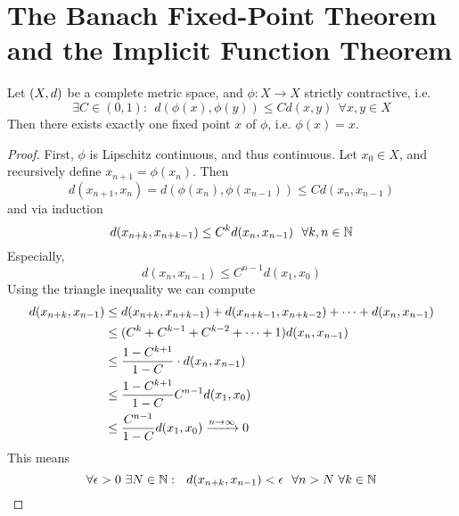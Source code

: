 \documentclass[../../script.tex]{subfiles}
\begin{document}
\section[Banach Fixed-Point \& Implicit Functions]{The Banach Fixed-Point Theorem and the Implicit Function Theorem}

\begin{thm}
    Let $(X, d)$ be a complete metric space, and $\phi: X \rightarrow X$ strictly contractive, i.e.
    \[
        \exists C \in (0, 1): ~~d(\phi(x), \phi(y)) \le C d(x, y) ~~\forall x, y \in X
    \]
    Then there exists exactly one fixed point $x$ of $\phi$, i.e. $\phi(x) = x$.
\end{thm}
\begin{proof}
    First, $\phi$ is Lipschitz continuous, and thus continuous.
    Let $x_0 \in X$, and recursively define $x_{n+1} = \phi(x_n)$. Then 
    \begin{equation}
        d(x_{n+1}, x_n) = d(\phi(x_n), \phi(x_{n-1})) \le C d(x_n, x_{n-1})
    \end{equation}
    and via induction
    \begin{equation}
        d(x_{n+k}, x_{n+k-1}) \le C^k d(x_n, x_{n-1}) ~~\forall k, n \in \mathbb{N}
    \end{equation}
    Especially,
    \begin{equation}
        d(x_n, x_{n-1}) \le C^{n-1} d(x_1, x_0)
    \end{equation}
    Using the triangle inequality we can compute 
    \begin{equation}
        \begin{split}
            d(x_{n+k}, x_{n-1}) &\le d(x_{n+k}, x_{n+k-1}) + d(x_{n+k-1}, x_{n+k-2}) + \cdots + d(x_n, x_{n-1}) \\
            &\le (C^k + C^{k-1} + C^{k-2} + \cdots + 1) d(x_n, x_{n-1}) \\
            &\le \frac{1 - C^{k+1}}{1 - C} \cdot d(x_n, x_{n-1}) \\
            &\le \frac{1 - C^{k+1}}{1 - C} C^{n-1} d(x_1, x_0) \\
            &\le \frac{C^{n-1}}{1 - C} d(x_1, x_0) \conv{n \rightarrow \infty} 0
        \end{split}
    \end{equation}
    This means
    \begin{equation}
        \forall \epsilon > 0 ~\exists N \in \mathbb{N}: ~~d(x_{n+k}, x_{n-1}) < \epsilon ~~\forall n > N ~\forall k \in \mathbb{N}
    \end{equation}

\end{proof}
\end{document}
